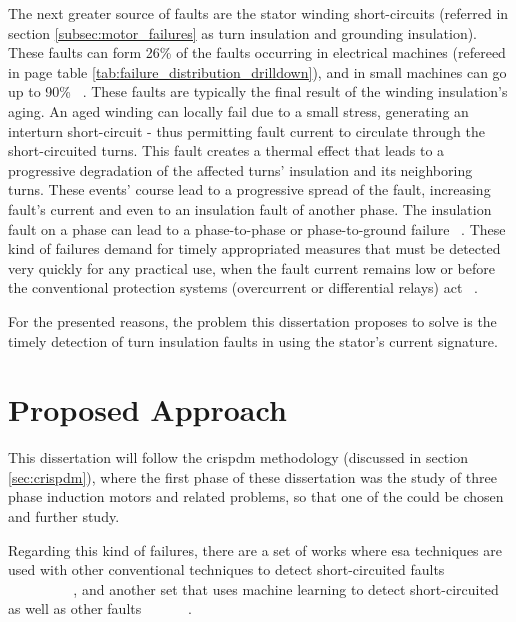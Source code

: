 The next greater source of faults are the stator winding short-circuits (referred in section \ref{subsec:motor_failures} as turn insulation and grounding insulation). These faults can form 26\% of the faults occurring in electrical machines (refereed in page \pageref{tab:failure_distribution_drilldown} table \ref{tab:failure_distribution_drilldown}), and in small machines can go up to 90\% ~\cite{Riera-Guasp2015}. These faults are typically the final result of the winding insulation's aging. An aged winding can locally fail due to a small stress, generating an interturn short-circuit - thus permitting fault current to circulate through the short-circuited turns. This fault creates a thermal effect that leads to a progressive degradation of the affected turns' insulation and its neighboring turns. These events' course lead to a progressive spread of the fault, increasing fault's current and even to an insulation fault of another phase. The insulation fault on a phase can lead to a phase-to-phase or phase-to-ground failure ~\cite{Riera-Guasp2015}. These kind of failures demand for timely appropriated measures that must be detected very quickly for any practical use, when the fault current remains low or before the conventional protection systems (overcurrent or differential relays) act ~\cite{Riera-Guasp2015}.

For the presented reasons, the problem this dissertation proposes to solve is the timely detection of turn insulation faults in  using the stator's current signature.





\section{Proposed Approach} %
\label{sec:proposed_approach}

This dissertation will follow the \acrlong{crispdm} methodology (discussed in section \ref{sec:crispdm}), where the first phase of these dissertation was the study of three phase induction motors and related problems, so that one of the could be chosen and further study. 

Regarding this kind of failures, there are a set of works where \Acrshort{esa} techniques are used with other conventional techniques to detect short-circuited faults ~\cite{Ourici2012} ~\cite{Cheng2011} ~\cite{Joksimovic2013} ~\cite{Cruz2001} ~\cite{Cabanas2013} ~\cite{Gandhi2011} ~\cite{Kia2013} ~\cite{M.a2014} ~\cite{Bouzid2013} ~\cite{Bakhri2012} ~\cite{Bakhri2012}, and another set that uses machine learning to detect short-circuited as well as other faults ~\cite{Toma2011} ~\cite{Wolkiewicz2013} ~\cite{Patel2016} ~\cite{Jagadanand2015}.

